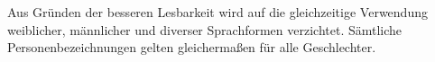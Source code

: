 Aus Gründen der besseren Lesbarkeit wird auf die gleichzeitige Verwendung weiblicher, männlicher und diverser Sprachformen verzichtet. Sämtliche Personenbezeichnungen gelten gleichermaßen für alle Geschlechter.
